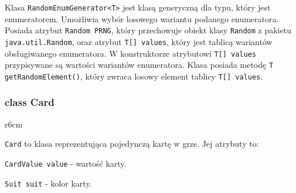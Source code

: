 \documentclass{article}
\begin{document}
Klasa \texttt{RandomEnumGenerator<T>} jest klasą generyczną dla typu, który jest enumeratorem. Umożliwia wybór losowego wariantu podanego enumeratora. Posiada atrybut \texttt{Random PRNG}, który przechowuje obiekt klasy \texttt{Random} z pakietu \texttt{java.util.Random}, oraz atrybut \texttt{T[] values}, który jest tablicą wariantów obsługiwanego enumeratora. W konstruktorze atrybutowi \texttt{T[] values} przypisywane są wartości wariantów enumeratora. Klasa posiada metodę \texttt{T getRandomElement()}, który zwraca losowy element tablicy \texttt{T[] values}.

\begin{center}
\end{center}


\subsubsection*{class Card}

\begin{wrapfigure}{r}{6cm}
\end{wrapfigure}

\texttt{Card} to klasa reprezentująca pojedynczą kartę w grze. Jej atrybuty to:

\texttt{CardValue value} - wartość karty.

\texttt{Suit suit} - kolor karty.
\end{document}

